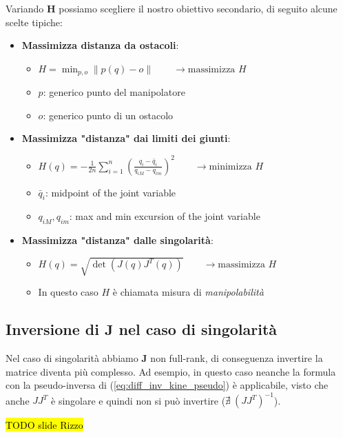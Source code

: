 Variando $\bm{H}$ possiamo scegliere il nostro obiettivo secondario, di seguito alcune scelte tipiche:
\begin{itemize}
	\item \textbf{Massimizza distanza da ostacoli}: 
	\begin{itemize}
		\item $\displaystyle H = \min_{p,o} \| p(q) - o \| \qquad \rightarrow \text{massimizza } H$
		\item $p$: generico punto del manipolatore
		\item $o$: generico punto di un ostacolo
	\end{itemize}
	
	\item \textbf{Massimizza "distanza" dai limiti dei giunti}: 
	\begin{itemize}
		\item $\displaystyle H(q)=-{\frac{1}{2n}}\sum_{i=1}^{n}\left({\frac{q_{i}-{\bar{q}}_{i}}{q_{i M}-q_{i m}}}\right)^{2} \qquad \rightarrow \text{minimizza } H$ 
		\item ${\bar{q}}_{i}$: midpoint of the joint variable
		\item $q_{iM},q_{im}$: max and min excursion of the joint variable
	\end{itemize}
	
	\item \textbf{Massimizza "distanza" dalle singolarità}: 
	\begin{itemize}
		\item $H(q)=\sqrt{\operatorname*{det}(J(q)J^{T}(q))} \qquad \rightarrow \text{massimizza } H$ 
		\item In questo caso $H$ è chiamata misura di \textit{manipolabilità}
	\end{itemize}
\end{itemize}






\subsection{Inversione di $\bm{J}$ nel caso di singolarità}
Nel caso di singolarità abbiamo $\bm{J}$ non full-rank, di conseguenza invertire la matrice diventa più complesso. Ad esempio, in questo caso neanche la formula con la pseudo-inversa di (\ref{eq:diff_inv_kine_pseudo}) è applicabile, visto che anche $JJ^T$ è singolare e quindi non si può invertire ($\nexists \ (JJ^T)^{-1}$).

\hl{TODO slide Rizzo}